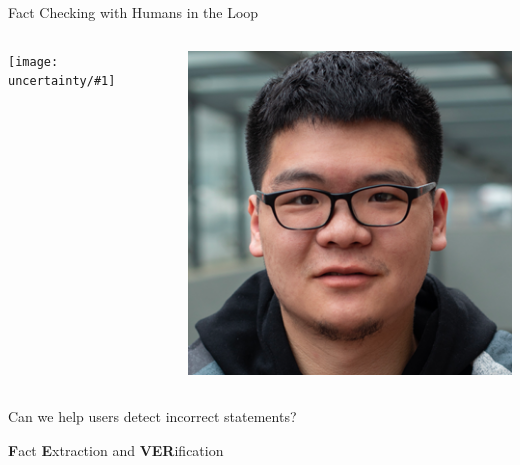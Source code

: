 \documentclass[compress]{beamer}
\newcommand{\fsi}[2]{
\begin{frame}[plain]
\vspace*{-1pt}
\makebox[\linewidth]{\texttt{[image: \#1]}}
\begin{center}
#2
\end{center}
\end{frame}
}
\newcommand{\gfxu}[2]{
	\begin{center}
		\texttt{[image: uncertainty/\#1]}
	\end{center}
}
\begin{document}
\begin{frame}{Fact Checking with Humans in the Loop}
	\begin{columns}
		
		\gfxu{paper_convincingly}{.9}
		
		\begin{center}
			\includegraphics[width=1.0\linewidth]{general_figures/chenglei}		
			
		\end{center}
	\end{columns}
	Can we help users detect incorrect statements?
	
\end{frame}

\fsi{uncertainty/fever}{\textbf{F}act \textbf{E}xtraction and \textbf{VER}ification}
\end{document}
